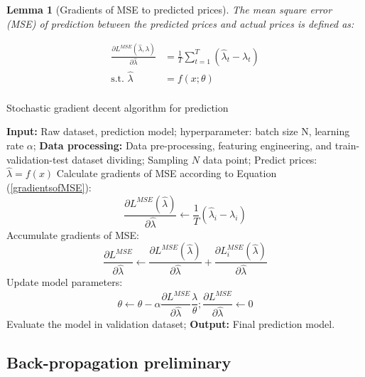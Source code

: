 \documentclass[journal]{IEEEtran}
\newtheorem{lemma}{Lemma}
\begin{document}
\begin{lemma}[Gradients of MSE to predicted prices]
  The mean square error (MSE) of prediction between the predicted prices and actual prices is defined as:
\end{lemma}
\begin{equation}
  \label{gradientsofMSE}
  \begin{aligned}
    \frac{\partial L^{MSE}(\hat{\lambda}, \lambda)}{\partial \hat{\lambda}} &= \frac{1}{T} \sum_{t=1}^T (\hat{\lambda}_t - \lambda_t) \\
    \text{s.t. } \hat{\lambda} &= f(x; \theta) \\
  \end{aligned}
\end{equation}

\begin{algorithm}[!t]
  \label{SGDPred}
  \caption{Stochastic gradient decent algorithm for prediction}
  {{
    \begin{algorithmic}[1]
      \STATE \textbf{Input:} Raw dataset, prediction model; hyperparameter: batch size N, learning rate $\alpha$;
      \STATE \textbf{Data processing:} Data pre-processing, featuring engineering, and train-validation-test dataset dividing; 
      \STATE Sampling $N$ data point; 
      \STATE Predict prices: $\hat{\lambda} = f(x)$
      \STATE Calculate gradients of MSE according to Equation (\ref{gradientsofMSE}): $$\frac{\partial L^{MSE}(\hat{\lambda}) }{\partial \hat{\lambda}} \leftarrow  \frac{1}{T} (\hat{\lambda}_i - \lambda_i)$$
      \STATE Accumulate gradients of MSE: $$ \frac{\partial L^{MSE} }{\partial \hat{\lambda}} \leftarrow \frac{\partial L^{MSE}(\hat{\lambda}) }{\partial \hat{\lambda}} + \frac{\partial L_i^{MSE}(\hat{\lambda})}{\partial \hat{\lambda}}$$
      \ENDFOR
      \STATE Update model parameters: $$\theta \leftarrow \theta - \alpha \frac{\partial L^{MSE}}{\partial \hat{\lambda}} \frac{\hat{\lambda}}{\theta}; \frac{\partial L^{MSE}}{\partial \hat{\lambda}} \leftarrow 0$$
      \STATE Evaluate the model in validation dataset;
      \ENDWHILE
      \STATE \textbf{Output:} Final prediction model.
    \end{algorithmic}
  }}
\end{algorithm}

\subsection{Back-propagation preliminary}
\end{document}

